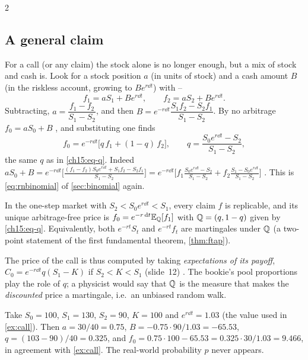 \begin{paracol}{2}
\subsection{A general claim}\label{ch15:sec-claim1}
For a call (or any claim) the stock alone is no longer enough, but a mix of stock and cash is. Look for a stock position $a$ (in units of stock)
and a cash amount $B$ (in the riskless account, growing to $Be^{r\dd t}$) with --
\begin{equation}\label{ch15:eq-repl}
  f_1=aS_1+Be^{r\dd t},\qquad f_2=aS_2+Be^{r\dd t}.
\end{equation}
Subtracting, $a=\dfrac{f_1-f_2}{S_1-S_2}$, and then $B=e^{-r\dd t}\dfrac{S_1f_2-S_2f_1}{S_1-S_2}$. By no arbitrage $f_0=aS_0+B$
, and substituting one finds
\begin{equation}\label{ch15:eq-f0}
  f_0=e^{-r\dd t}\bigl[q\,f_1+(1-q)\,f_2\bigr],\qquad q=\frac{S_0e^{r\dd t}-S_2}{S_1-S_2},
\end{equation}
the same $q$ as in \eqref{ch15:eq-q}. Indeed
$aS_0+B=e^{-r\dd t}\bigl[\frac{(f_1-f_2)S_0e^{r\dd t}+S_1f_2-S_2f_1}{S_1-S_2}\bigr]
=e^{-r\dd t}\bigl[f_1\frac{S_0e^{r\dd t}-S_2}{S_1-S_2}+f_2\frac{S_1-S_0e^{r\dd t}}{S_1-S_2}\bigr]$
. This is \eqref{eq:rnbinomial} of \cref{sec:binomial} again.

\begin{proposition}\label{ch15:prop-onestep}
In the one-step market with $S_2<S_0e^{r\dd t}<S_1$, every claim $f$ is replicable, and its unique arbitrage-free price is
$f_0=e^{-r\,\mathrm{d} t}\mathbb{E}_{\mathbb{Q}}[f_1]$ with $\mathbb{Q}=(q,1-q)$ given by \eqref{ch15:eq-q}. Equivalently, both $e^{-rt}S_t$ and $e^{-rt}f_t$ are martingales under $\mathbb{Q}$
(a two-point statement of the first fundamental theorem, \cref{thm:ftap}).
\end{proposition}
The price of the call is thus computed by taking \emph{expectations of its payoff}, $C_0=e^{-r\dd t}q(S_1-K)$ if $S_2<K<S_1$
(slide~12) . The bookie's pool proportions play the role of $q$; a physicist would say that $\mathbb{Q}$ is the measure that makes the
\emph{discounted} price a martingale, i.e.\ an unbiased random walk.

\begin{example}\label{ch15:ex-call1}
Take $S_0=100$, $S_1=130$, $S_2=90$, $K=100$ and $e^{r\dd t}=1.03$ (the value used in \cref{ex:call}). Then $a=30/40=0.75$,
$B=-0.75\cdot90/1.03=-65.53$, $q=(103-90)/40=0.325$, and $f_0=0.75\cdot100-65.53=0.325\cdot30/1.03=9.466$, in agreement with
\cref{ex:call}. The real-world probability $p$ never appears.
\end{example}


\end{paracol}
